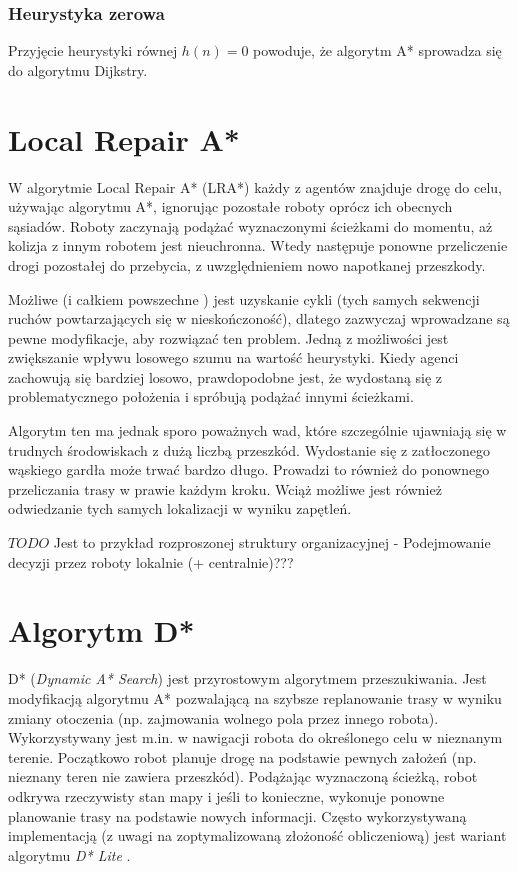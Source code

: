 \subsubsection{Heurystyka zerowa}
Przyjęcie heurystyki równej $h(n) = 0$ powoduje, że algorytm A* sprowadza się do algorytmu Dijkstry.

\section{Local Repair A*}
W algorytmie Local Repair A* (LRA*) każdy z agentów znajduje drogę do celu, używając algorytmu A*, ignorując pozostałe roboty oprócz ich obecnych sąsiadów. Roboty zaczynają podążać wyznaczonymi ścieżkami do momentu, aż kolizja z innym robotem jest nieuchronna. Wtedy następuje ponowne przeliczenie drogi pozostałej do przebycia, z uwzględnieniem nowo napotkanej przeszkody.

Możliwe (i całkiem powszechne \cite{cooppath}) jest uzyskanie cykli (tych samych sekwencji ruchów powtarzających się w nieskończoność), dlatego zazwyczaj wprowadzane są pewne modyfikacje, aby rozwiązać ten problem. Jedną z możliwości jest zwiększanie wpływu losowego szumu na wartość heurystyki. Kiedy agenci zachowują się bardziej losowo, prawdopodobne jest, że wydostaną się z problematycznego położenia i spróbują podążać innymi ścieżkami.

Algorytm ten ma jednak sporo poważnych wad, które szczególnie ujawniają się w trudnych środowiskach z dużą liczbą przeszkód. Wydostanie się z zatłoczonego wąskiego gardła może trwać bardzo długo. Prowadzi to również do ponownego przeliczania trasy w prawie każdym kroku. Wciąż możliwe jest również odwiedzanie tych samych lokalizacji w wyniku zapętleń.

$TODO$ Jest to przykład rozproszonej struktury organizacyjnej - Podejmowanie decyzji przez roboty lokalnie (+ centralnie)???

\section{Algorytm D*}
D* ({\it Dynamic A* Search}) jest przyrostowym algorytmem przeszukiwania. Jest modyfikacją algorytmu A* pozwalającą na szybsze replanowanie trasy w wyniku zmiany otoczenia (np. zajmowania wolnego pola przez innego robota). Wykorzystywany jest m.in. w nawigacji robota do określonego celu w nieznanym terenie. Początkowo robot planuje drogę na podstawie pewnych założeń (np. nieznany teren nie zawiera przeszkód). Podążając wyznaczoną ścieżką, robot odkrywa rzeczywisty stan mapy i jeśli to konieczne, wykonuje ponowne planowanie trasy na podstawie nowych informacji.
Często wykorzystywaną implementacją (z uwagi na zoptymalizowaną złożoność obliczeniową) jest wariant algorytmu {\it D* Lite} \cite{dstarlite}.

